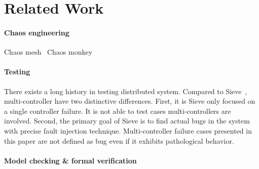 \section{Related Work}
\label{sec:related_work}


\paragraph*{Chaos engineering}
Chaos mesh~\cite{chaosmesh}
Chaos monkey~\cite{chaosmonkey}

\paragraph*{Testing}
There exists a long history in testing distributed system. Compared to Sieve~\cite{sieve}, multi-controller have two distinctive differences. First, it is Sieve only focused on a single controller failure. It is not able to test cases multi-controllers are involved. Second, the primary goal of Sieve is to find actual bugs in the system with precise fault injection technique. Multi-controller failure cases presented in this paper are not defined as bug even if it exhibits pathological behavior.

\paragraph*{Model checking & formal verification}